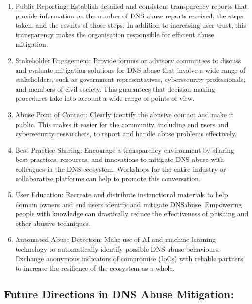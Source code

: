 \begin{enumerate}
    \item Public Reporting: Establish detailed and consistent transparency reports that provide information on the number of DNS abuse reports received, the steps taken, and the results of those steps. In addition to increasing user trust, this transparency makes the organisation responsible for efficient abuse mitigation.

    \item Stakeholder Engagement: Provide forums or advisory committees to discuss and evaluate mitigation solutions for DNS abuse that involve a wide range of stakeholders, such as government representatives, cybersecurity professionals, and members of civil society. This guarantees that decision-making procedures take into account a wide range of points of view.

    \item Abuse Point of Contact: Clearly identify the abusive contact and make it public. This makes it easier for the community, including end users and cybersecurity researchers, to report and handle abuse problems effectively.

    \item Best Practice Sharing: Encourage a transparency environment by sharing best practices, resources, and innovations to mitigate DNS abuse with colleagues in the DNS ecosystem. Workshops for the entire industry or collaborative platforms can help to promote this conversation.

    \item User Education: Recreate and distribute instructional materials to help domain owners and end users identify and mitigate DNSabuse. Empowering people with knowledge can drastically reduce the effectiveness of phishing and other abusive techniques.

    \item Automated Abuse Detection: Make use of AI and machine learning technology to automatically identify possible DNS abuse behaviours. Exchange anonymous indicators of compromise (IoCs) with reliable partners to increase the resilience of the ecosystem as a whole.

\end{enumerate}


\subsection{Future Directions in DNS Abuse Mitigation: }

